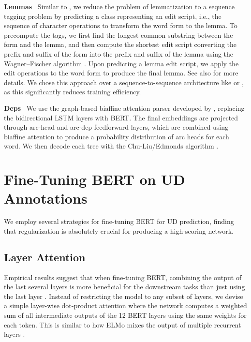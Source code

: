 \documentclass[11pt,a4paper]{article}
\begin{document}
{\bf Lemmas} \, Similar to , we reduce the problem of lemmatization to a sequence tagging problem by predicting a class representing an edit script, i.e., the sequence of character operations to transform the word form to the lemma.
To precompute the tags, we first find the longest common substring between the form and the lemma, and then compute the shortest edit script converting the prefix and suffix of the form into the prefix and suffix of the lemma using the Wagner--Fischer algorithm \cite{wagner1974string}.
Upon predicting a lemma edit script, we apply the edit operations to the word form to produce the final lemma.
See also  for more details.
We chose this approach over a sequence-to-sequence architecture like  or , as this significantly reduces training efficiency.

{\bf Deps} \, We use the graph-based biaffine attention parser developed by , replacing the bidirectional LSTM layers with BERT.
The final embeddings are projected through arc-head and arc-dep feedforward layers, which are combined using biaffine attention to produce a probability distribution of arc heads for each word.
We then decode each tree with the Chu-Liu/Edmonds algorithm \cite{chu1965shortest, edmonds1967optimum}.

\section{Fine-Tuning BERT on UD Annotations}

We employ several strategies for fine-tuning BERT for UD prediction, finding that regularization is absolutely crucial for producing a high-scoring network.

\subsection{Layer Attention} \label{sec:layer-attention}

Empirical results suggest that when fine-tuning BERT, combining the output of the last several layers is more beneficial for the downstream tasks than just using the last layer \cite{devlin2018bert}.
Instead of restricting the model to any subset of layers, we devise a simple layer-wise dot-product attention where the network computes a weighted sum of all intermediate outputs of the 12 BERT layers using the same weights for each token.
This is similar to how ELMo mixes the output of multiple recurrent layers \cite{Peters:2018}.
\end{document}
